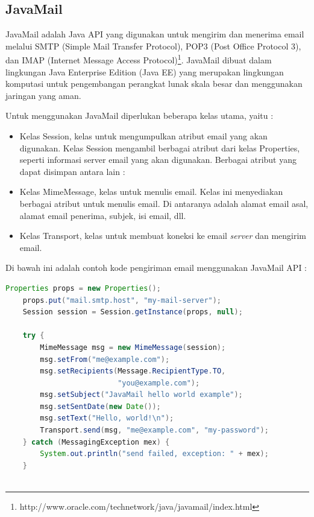 \subsection{JavaMail}
\label{javamail}
JavaMail adalah Java API yang digunakan untuk mengirim dan menerima email melalui SMTP (Simple Mail Transfer Protocol), POP3 (Post Office Protocol 3), dan IMAP (Internet Message Access Protocol)\footnote{http://www.oracle.com/technetwork/java/javamail/index.html}. JavaMail dibuat dalam lingkungan Java Enterprise Edition (Java EE) yang merupakan lingkungan komputasi untuk pengembangan perangkat lunak skala besar dan menggunakan jaringan yang aman.


Untuk menggunakan JavaMail diperlukan beberapa kelas utama, yaitu :
\begin{itemize}
	\item Kelas Session, kelas untuk mengumpulkan atribut email yang akan digunakan. Kelas Session mengambil berbagai atribut dari kelas Properties, seperti informasi server email yang akan digunakan. Berbagai atribut yang dapat disimpan antara lain :
	\item Kelas MimeMessage, kelas untuk menulis email. Kelas ini menyediakan berbagai atribut untuk menulis email. Di antaranya adalah alamat email asal, alamat email penerima, subjek, isi email, dll.
	\item Kelas Transport, kelas untuk membuat koneksi ke email \textit{server} dan mengirim email.
\end{itemize}
Di bawah ini adalah contoh kode pengiriman email menggunakan JavaMail API : 

\begin{lstlisting}[language=Java,basicstyle=\tiny,caption=Contoh Kode Pengiriman Email]
Properties props = new Properties();
    props.put("mail.smtp.host", "my-mail-server");
    Session session = Session.getInstance(props, null);

    try {
        MimeMessage msg = new MimeMessage(session);
        msg.setFrom("me@example.com");
        msg.setRecipients(Message.RecipientType.TO,
                          "you@example.com");
        msg.setSubject("JavaMail hello world example");
        msg.setSentDate(new Date());
        msg.setText("Hello, world!\n");
        Transport.send(msg, "me@example.com", "my-password");
    } catch (MessagingException mex) {
        System.out.println("send failed, exception: " + mex);
    }
		
\end{lstlisting}


